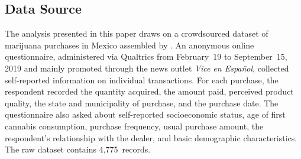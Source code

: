 
\subsection{Data Source}

The analysis presented in this paper draws on a crowdsourced dataset of marijuana purchases in Mexico assembled by \citet{bejaranoromero2020dataset}.  An anonymous online questionnaire, administered via Qualtrics from February~19 to September~15, 2019 and mainly promoted through the news outlet \emph{Vice en Espa\~{n}ol}, collected self-reported information on individual transactions.  For each purchase, the respondent recorded the quantity acquired, the amount paid, perceived product quality, the state and municipality of purchase, and the purchase date.  The questionnaire also asked about self-reported socioeconomic status, age of first cannabis consumption, purchase frequency, usual purchase amount, the respondent's relationship with the dealer, and basic demographic characteristics.  The raw dataset contains 4{,}775~records.

